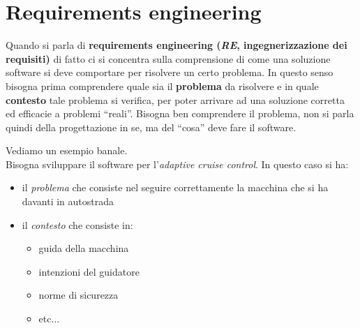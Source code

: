 \documentclass[a4paper,12pt, oneside]{book}
\begin{document}
\chapter{Requirements engineering}
Quando si parla di \textbf{requirements engineering (\textit{RE},
  ingegnerizzazione dei requisiti)} di fatto ci si concentra sulla comprensione
di come una soluzione software si deve comportare per risolvere un certo
problema. In questo senso bisogna prima comprendere quale sia il\textbf{
  problema} da risolvere e in quale \textbf{contesto} tale problema si verifica,
per poter arrivare ad una soluzione corretta ed efficacie a problemi
``reali''. Bisogna ben comprendere il problema, non si parla quindi della
progettazione in se, ma del ``cosa'' deve fare il software.
\begin{esempio}
  Vediamo un esempio banale.\\
  Bisogna sviluppare il software per l'\textit{adaptive cruise control}. In
  questo caso si ha:
  \begin{itemize}
    \item il \textit{problema} che consiste nel seguire correttamente la
    macchina che si ha davanti in autostrada
    \item il \textit{contesto} che consiste in:
    \begin{itemize}
      \item guida della macchina
      \item intenzioni del guidatore
      \item norme di sicurezza
      \item etc$\ldots$
    \end{itemize}
  \end{itemize}
\end{esempio}
\end{document}
